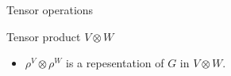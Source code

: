 \documentclass[10pt]{beamer}
\newcommand{\GL}{\text{GL}}
\newcommand{\RR}{\mathbb{R}}
\begin{document}
\begin{frame}{Tensor operations}
		
%				
		
		
		\begin{block}{Tensor product $V \otimes W$}
			\begin{itemize}
%				
%				
%				
				\item $\rho^V \otimes \rho^W$ is a repesentation of $G$ in $V \otimes W$.
			\end{itemize}
		\end{block}		


\end{frame}
\end{document}
